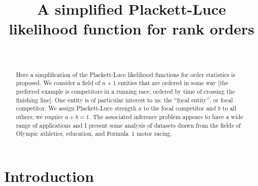 \documentclass[sts]{imsart}
\begin{document}
\begin{frontmatter}
\title{A simplified Plackett-Luce likelihood function for rank orders}

\begin{aug}
\author[A]{~}
\address[A]{University of Stirlling.}
\end{aug}

\begin{abstract}

Here a simplification of the Plackett-Luce likelihood functions for
order statistics is proposed.  We consider a field of $n+1$ entities
that are ordered in some way [the preferred example is competitors in
  a running race, ordered by time of crossing the finishing line].
One entity is of particular interest to us: the ``focal entity'', or
focal competitor.  We assign Plackett-Luce strength $a$ to the focal
competitor and $b$ to all others; we require $a+b=1$.  The associated
inference problem appears to have a wide range of applications and I
present some analysis of datasets drawn from the fields of Olympic
athletics, education, and Formula~1 motor racing.
\end{abstract}

\begin{keyword}
\end{keyword}

\end{frontmatter}


\section{Introduction}
\end{document}
